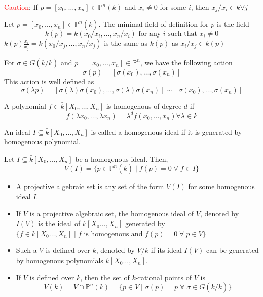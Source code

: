 \documentclass[oneside, 12pt]{scrbook}
\theoremstyle{theorem}
\begin{document}
\textcolor{red}{Caution}: If $p = [x_{0},\hdots ,x_{n}] \in \mathbb{P}^n(k)$ and $x_{i} \neq 0$ for some $i$, then $x_{j}/x_{i} \in k \forall j$

\begin{definition}
Let $p = [x_{0},\hdots ,x_{n}] \in \mathbb{P}^n(\bar{k})$. The minimal field of definition for $p$ is the field $$k(p) = k(x_{0}/x_{i},\hdots ,x_{n}/x_{i}) \text{ for any } i \text{ such that } x_{i} \neq 0$$
$k(p) \frac{x_{i}}{x_{j}} = k(x_{0}/x_{j},\hdots ,x_{n}/x_{j})$ is the same as $k(p)$ as $x_{i}/x_{j} \in k(p)$
\end{definition}  

For $\sigma \in G(\bar{k}/k)$ and $p = [x_{0},\hdots ,x_{n}] \in \mathbb{P}^n$, we have the following action $$\sigma(p) = [\sigma(x_{0}),\hdots ,\sigma(x_{n})]$$
This action is well defined as $$\sigma(\lambda p) = [\sigma(\lambda)\sigma(x_{0}),\hdots ,\sigma(\lambda) \sigma(x_{n})] \sim [\sigma(x_{0}),\hdots ,\sigma(x_{n})]$$

\begin{definition}
A polynomial $f \in \bar{k}[X_{0}, \hdots , X_{n}]$ is homogenous of degree $d$ if $$f(\lambda x_{0} , \hdots , \lambda x_{n})  = \lambda^d f(x_{0} , \hdots ,x_{n}) \forall \lambda \in \bar{k}$$
\end{definition}

\begin{definition}
An ideal $I \subseteq \bar{k}[X_{0} , \hdots , X_{n}]$ is called a homogenous ideal if it is generated by homogenous polynomial.  
\end{definition}

\begin{definition}
Let $I \subseteq \bar{k}[X_{0} , \hdots , X_{n}]$ be a homogenous ideal. Then, $$V(I) = \{p \in \mathbb{P}^n (\bar{k}) \mid f(p)=0 \; \forall \; f\in I\}$$
\end{definition}

\begin{definition}
\begin{itemize}
\item A projective algebraic set is any set of the form $V(I)$ for some homogenous ideal $I$. 
\item If $V$ is a projective algebraic set, the homogenous ideal of $V$, denoted by $I(V)$ is the ideal of $\bar{k}[X_{0} \hdots , X_{n}]$ generated by $\{f \in \bar{k}[X_{0} \hdots , X_{n}]\mid f \text{ is homogenous and }f(p)= 0 \; \forall \; p\in V\}$
\item Such a $V$ is defined over $k$, denoted by $V/k$ if its ideal $I(V)$ can be generated by homogenous polynomials $k[X_{0} \hdots , X_{n}]$. 
\item If $V$ is defined over $k$, then the set of $k$-rational points of $V$ is $$V(k) = V \cap \mathbb{P}^{n}(k) = \{p \in V \mid \sigma(p)=p \; \forall \; \sigma \in G(\bar{k}/k)\}$$
\end{itemize}
\end{definition}
\end{document}
